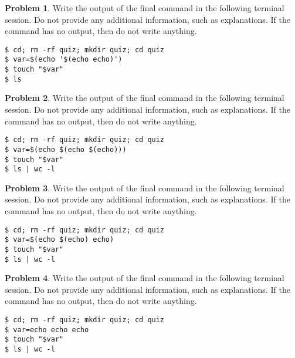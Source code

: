 \documentclass[10pt]{article}
\theoremstyle{definition}
\newtheorem{problem}{Problem}
\begin{document}
\begin{samepage}
\begin{problem}
Write the output of the final command in the following terminal session.
Do not provide any additional information,
such as explanations.
If the command has no output,
then do not write anything.

\end{problem}
\begin{lstlisting}
$ cd; rm -rf quiz; mkdir quiz; cd quiz
$ var=$(echo '$(echo echo)')
$ touch "$var"
$ ls
\end{lstlisting}
\end{samepage}


\begin{samepage}
\begin{problem}
Write the output of the final command in the following terminal session.
Do not provide any additional information,
such as explanations.
If the command has no output,
then do not write anything.

\end{problem}
\begin{lstlisting}
$ cd; rm -rf quiz; mkdir quiz; cd quiz
$ var=$(echo $(echo $(echo)))
$ touch "$var"
$ ls | wc -l
\end{lstlisting}
\end{samepage}


\begin{samepage}
\begin{problem}
Write the output of the final command in the following terminal session.
Do not provide any additional information,
such as explanations.
If the command has no output,
then do not write anything.

\end{problem}
\begin{lstlisting}
$ cd; rm -rf quiz; mkdir quiz; cd quiz
$ var=$(echo $(echo) echo)
$ touch "$var"
$ ls | wc -l
\end{lstlisting}
\end{samepage}


\begin{samepage}
\begin{problem}
Write the output of the final command in the following terminal session.
Do not provide any additional information,
such as explanations.
If the command has no output,
then do not write anything.

\end{problem}
\begin{lstlisting}
$ cd; rm -rf quiz; mkdir quiz; cd quiz
$ var=echo echo echo
$ touch "$var"
$ ls | wc -l
\end{lstlisting}
\end{samepage}
\end{document}
